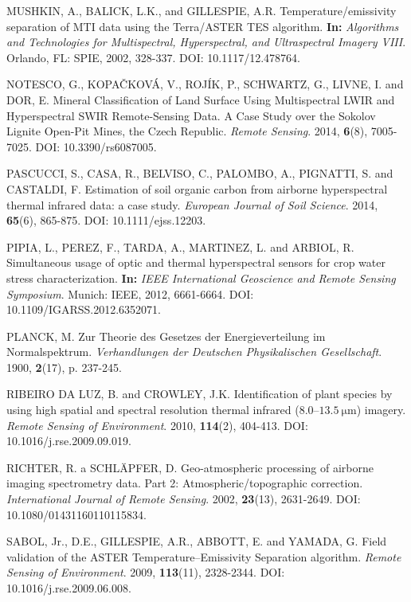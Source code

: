 \begin{thebibliography}{10}
 MUSHKIN, A., BALICK, L.K., and GILLESPIE, A.R. Temperature/emissivity separation of MTI data using the Terra/ASTER TES algorithm. \textbf{In:} \textit{Algorithms and Technologies for Multispectral, Hyperspectral, and Ultraspectral Imagery VIII}. Orlando, FL: SPIE, 2002, 328-337. DOI: 10.1117/12.478764.

 NOTESCO, G., KOPAČKOVÁ, V., ROJÍK, P., SCHWARTZ, G., LIVNE, I. and DOR, E. Mineral Classification of Land Surface Using Multispectral LWIR and Hyperspectral SWIR Remote-Sensing Data. A Case Study over the Sokolov Lignite Open-Pit Mines, the Czech Republic. \textit{Remote Sensing}. 2014, \textbf{6}(8), 7005-7025. DOI: 10.3390/rs6087005.

 PASCUCCI, S., CASA, R., BELVISO, C., PALOMBO, A., PIGNATTI, S. and CASTALDI, F. Estimation of soil organic carbon from airborne hyperspectral thermal infrared data: a case study. \textit{European Journal of Soil Science}. 2014, \textbf{65}(6), 865-875. DOI: 10.1111/ejss.12203.

 PIPIA, L., PEREZ, F., TARDA, A., MARTINEZ, L. and ARBIOL, R. Simultaneous usage of optic and thermal hyperspectral sensors for crop water stress characterization. \textbf{In:} \textit{IEEE International Geoscience and Remote Sensing Symposium}. Munich: IEEE, 2012, 6661-6664. DOI: 10.1109/IGARSS.2012.6352071. 

 PLANCK, M. Zur Theorie des Gesetzes der Energieverteilung im Normalspektrum. \textit{Verhandlungen der Deutschen Physikalischen Gesellschaft}. 1900, \textbf{2}(17), p. 237-245.

 RIBEIRO DA LUZ, B. and CROWLEY, J.K. Identification of plant species by using high spatial and spectral resolution thermal infrared (8.0–$\SI{13.5}{\micro\meter}$) imagery. \textit{Remote Sensing of Environment}. 2010, \textbf{114}(2), 404-413. DOI: 10.1016/j.rse.2009.09.019.

 RICHTER, R. a SCHLÄPFER, D. Geo-atmospheric processing of airborne imaging spectrometry data. Part 2: Atmospheric/topographic correction. \textit{International Journal of Remote Sensing}. 2002, \textbf{23}(13), 2631-2649. DOI: 10.1080/01431160110115834.

 SABOL, Jr., D.E., GILLESPIE, A.R., ABBOTT, E. and YAMADA, G. Field validation of the ASTER Temperature–Emissivity Separation algorithm. \textit{Remote Sensing of Environment}. 2009, \textbf{113}(11), 2328-2344. DOI: 10.1016/j.rse.2009.06.008.


\end{thebibliography}
